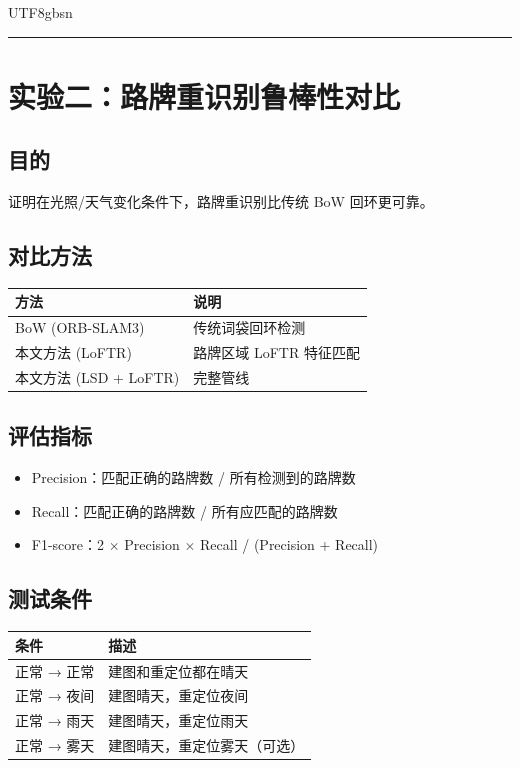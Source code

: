 \documentclass{article}
\begin{document}
\begin{CJK}{UTF8}{gbsn}
\vspace{0.5cm}
\hrule

\section{实验二：路牌重识别鲁棒性对比}

\subsection{目的}
证明在光照/天气变化条件下，路牌重识别比传统 BoW 回环更可靠。

\subsection{对比方法}

\begin{tabular}{ll}
\toprule
方法 & 说明 \\
\midrule
BoW (ORB-SLAM3) & 传统词袋回环检测 \\
本文方法 (LoFTR) & 路牌区域 LoFTR 特征匹配 \\
本文方法 (LSD + LoFTR) & 完整管线 \\
\bottomrule
\end{tabular}

\subsection{评估指标}

\begin{itemize}
    \item Precision：匹配正确的路牌数 / 所有检测到的路牌数
    \item Recall：匹配正确的路牌数 / 所有应匹配的路牌数
    \item F1-score：2 $\times$ Precision $\times$ Recall / (Precision + Recall)
\end{itemize}

\subsection{测试条件}

\begin{tabular}{ll}
\toprule
条件 & 描述 \\
\midrule
正常 → 正常 & 建图和重定位都在晴天 \\
正常 → 夜间 & 建图晴天，重定位夜间 \\
正常 → 雨天 & 建图晴天，重定位雨天 \\
正常 → 雾天 & 建图晴天，重定位雾天（可选） \\
\bottomrule
\end{tabular}


\end{CJK}
\end{document}

